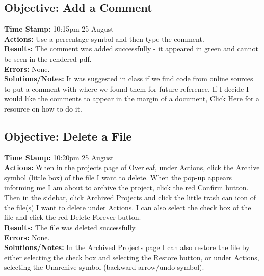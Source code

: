 \documentclass{article}
\begin{document}
\begin{FlushLeft}
\subsection{Objective: Add a Comment}
\textbf{Time Stamp:} 10:15pm 25 August \\%
\textbf{Actions:} Use a percentage symbol and then type the comment. \\
\textbf{Results:} The comment was added successfully - it appeared in green and cannot be seen in the rendered pdf.\\
\textbf{Errors:} None.\\
\textbf{Solutions/Notes:} It was suggested in class if we find code from online sources to put a comment with where we found them for future reference. If I decide I would like the comments to appear in the margin of a document, \href{https://www.overleaf.com/blog/619-tip-of-the-week-add-inline-or-margin-comments-to-your-pdf}{Click Here} for a resource on how to do it.

\subsection{Objective: Delete a File}
\textbf{Time Stamp:} 10:20pm 25 August\\
\textbf{Actions:} When in the projects page of Overleaf, under Actions, click the Archive symbol (little box) of the file I want to delete. When the pop-up appears informing me I am about to archive the project, click the red Confirm button. Then in the sidebar, click Archived Projects and click the little trash can icon of the file(s) I want to delete under Actions. I can also select the check box of the file and click the red Delete Forever button.\\
\textbf{Results:} The file was deleted successfully.\\
\textbf{Errors:} None.\\
\textbf{Solutions/Notes:} In the Archived Projects page I can also restore the file by either selecting the check box and selecting the Restore button, or under Actions, selecting the Unarchive symbol (backward arrow/undo symbol).


\end{FlushLeft}
\end{document}
